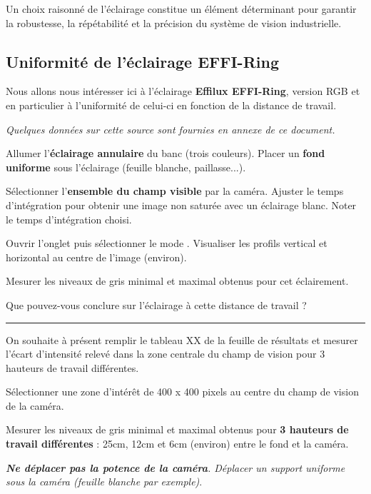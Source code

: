 Un choix raisonné de l'éclairage constitue un élément déterminant pour garantir la robustesse, la répétabilité et la précision du système de vision industrielle.

\subsection{Uniformité de l'éclairage EFFI-Ring}

Nous allons nous intéresser ici à l'éclairage \textbf{Effilux EFFI-Ring}, version RGB et en particulier à l'uniformité de celui-ci en fonction de la distance de travail.

\textit{Quelques données sur cette source sont fournies en annexe de ce document.}

\Manip Allumer l'\textbf{éclairage annulaire} du banc (trois couleurs). Placer un \textbf{fond uniforme} sous l'éclairage (feuille blanche, paillasse...).

\Manip Sélectionner l'\textbf{ensemble du champ visible} par la caméra. Ajuster le temps d'intégration pour obtenir une image non saturée avec un éclairage blanc. Noter le temps d'intégration choisi. 

\Manip Ouvrir l'onglet  puis sélectionner le mode . Visualiser les profils vertical et horizontal au centre de l'image (environ).


\Manip Mesurer les niveaux de gris minimal et maximal obtenus pour cet éclairement. 

\Quest Que pouvez-vous conclure sur l'éclairage à cette distance de travail ? 

\noindent \rule{\linewidth}{1pt}

On souhaite à présent remplir le tableau XX de la feuille de résultats et mesurer l'écart d'intensité relevé dans la zone centrale du champ de vision pour 3 hauteurs de travail différentes.

\Manip Sélectionner une zone d'intérêt de 400 x 400 pixels au centre du champ de vision de la caméra.

\Manip Mesurer les niveaux de gris minimal et maximal obtenus pour \textbf{3 hauteurs de travail différentes} : 25cm, 12cm et 6cm (environ) entre le fond et la caméra. 

\medskip

\textit{\textbf{Ne déplacer pas la potence de la caméra}. Déplacer un support uniforme sous la caméra (feuille blanche par exemple)}.

